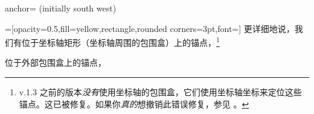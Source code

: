 \begin{pgfplotskey}{anchor= (initially south west)}
    {%
    \plottable
    \def\plot{%
        \begin{axis}[
            width=5cm,
            name=test plot,
            xlabel=$x$,
            ylabel={$y$},%
            legend pos=outer north east,
            title=A test plot.,
        ]
            \addplot table from{\plottable};
            \addlegendentry{$f(x)$}
            \addplot [red] plot [id=gnuplot_ppp,domain=-40:40,samples=120] gnuplot{10000*sin(x/3)};
            \addlegendentry{$g(x)$}
        \end{axis}
    }%
    \def\showit#1#2{%
        \node[pin=#2:(s.#1),fill=black,circle,scale=0.3] at (test plot.#1) {};
    }%
    =[opacity=0.5,fill=yellow,rectangle,rounded corners=3pt,font=\tiny]%
    更详细地说，我们有位于坐标轴矩形（坐标轴周围的包围盒）上的锚点，\footnote{\PGFPlots{} v.1.3 之前的版本\emph{没有}使用坐标轴的包围盒，它们使用坐标轴坐标来定位这些锚点。这已被修复。如果你\emph{真的}想撤销此错误修复，参见 \texttt{\protect{}}。}
        \begin{center}
        \end{center}
    位于外部包围盒上的锚点，
        \begin{center}
\end{center}}
\end{pgfplotskey}
